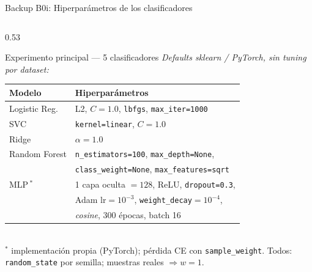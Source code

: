 \begin{frame}{Backup B0i: Hiperparámetros de los clasificadores}
\scriptsize
\begin{columns}[T]

\begin{column}{0.53\textwidth}
\begin{block}{\small Experimento principal --- 5 clasificadores}
\scriptsize
\textit{Defaults sklearn / PyTorch, sin tuning por dataset:}\\[2pt]
\setlength{\tabcolsep}{3pt}
\renewcommand{\arraystretch}{1.25}
\begin{tabular}{@{}ll@{}}
\toprule
Modelo & Hiperparámetros \\
\midrule
Logistic Reg.\ & L2, $C{=}1{.}0$, \texttt{lbfgs}, \texttt{max\_iter=1000} \\
SVC            & \texttt{kernel=linear}, $C{=}1{.}0$ \\
Ridge          & $\alpha{=}1{.}0$ \\
Random Forest  & \texttt{n\_estimators=100}, \texttt{max\_depth=None}, \\
               & \texttt{class\_weight=None}, \texttt{max\_features=sqrt} \\
MLP\,$^{*}$    & 1 capa oculta $=128$, ReLU, \texttt{dropout=0.3}, \\
               & Adam lr$=10^{-3}$, \texttt{weight\_decay}$=10^{-4}$, \\
               & \emph{cosine}, 300 épocas, batch 16 \\
\bottomrule
\end{tabular}\\[3pt]
{\tiny $^{*}$ implementación propia (PyTorch); pérdida CE con \texttt{sample\_weight}. Todos: \texttt{random\_state} por semilla; muestras reales $\Rightarrow w{=}1$.}
\end{block}
\end{column}


\end{columns}
\end{frame}
